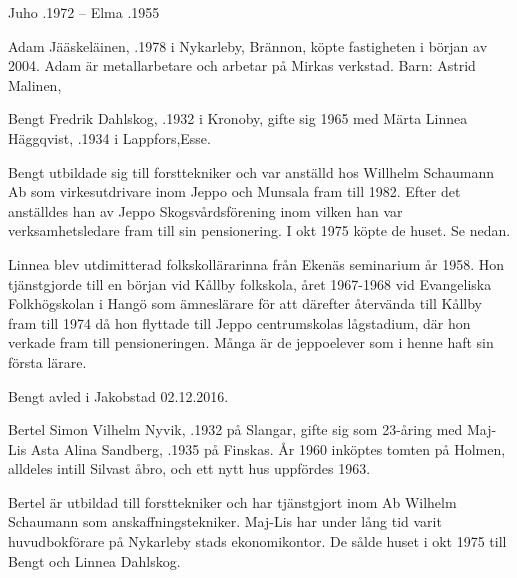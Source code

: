 Juho .1972  --  Elma .1955




Adam Jääskeläinen, .1978 i Nykarleby, Brännon, köpte fastigheten i början av 2004. Adam är metallarbetare och arbetar på Mirkas verkstad.
Barn: Astrid Malinen, 


Bengt Fredrik Dahlskog, .1932 i Kronoby, gifte sig 1965 med Märta Linnea Häggqvist, .1934 i Lappfors,Esse.

Bengt utbildade sig till forsttekniker och var anställd hos Willhelm Schaumann Ab som virkesutdrivare inom Jeppo och Munsala fram till 1982. Efter det anställdes han av Jeppo Skogsvårdsförening inom vilken han var verksamhetsledare fram till sin pensionering. I okt 1975 köpte de huset. Se nedan.


Linnea blev utdimitterad folkskollärarinna från Ekenäs seminarium år 1958. Hon tjänstgjorde till en början vid Kållby folkskola, året 1967-1968 vid Evangeliska Folkhögskolan i Hangö som ämneslärare för att därefter återvända till Kållby fram till 1974 då hon flyttade till Jeppo centrumskolas lågstadium, där hon verkade fram till pensioneringen. Många är de jeppoelever som i henne haft sin första lärare.
\begin{jhchildren}
  \item {}
  \item {}
  \item {}
\end{jhchildren}

Bengt avled i Jakobstad 02.12.2016.


Bertel Simon Vilhelm Nyvik, .1932 på Slangar, gifte sig som 23-åring med Maj-Lis Asta Alina Sandberg, .1935 på Finskas. År 1960 inköptes tomten på Holmen, alldeles intill Silvast åbro, och ett nytt hus uppfördes 1963.

Bertel är utbildad till forsttekniker och har tjänstgjort inom Ab Wilhelm Schaumann som anskaffningstekniker. Maj-Lis har under lång tid varit huvudbokförare på Nykarleby stads ekonomikontor. De sålde huset i okt 1975 till Bengt och Linnea Dahlskog.



